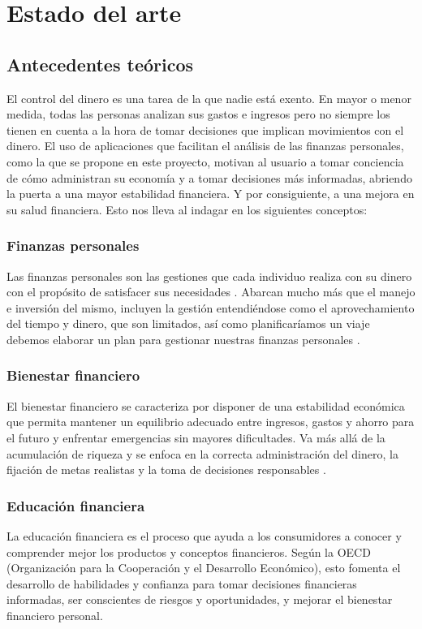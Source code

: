\chapter{Estado del arte}

\section{Antecedentes teóricos}

El control del dinero es una tarea de la que nadie está exento. En mayor o menor 
medida, todas las personas analizan sus gastos e ingresos pero no siempre los tienen en 
cuenta a la hora de tomar decisiones que implican movimientos con el dinero. El uso de 
aplicaciones que facilitan el análisis de las finanzas personales, como la que se propone 
en este proyecto,  motivan al usuario a tomar conciencia de cómo administran su economía 
y a tomar decisiones más informadas, abriendo la puerta a una mayor estabilidad financiera. 
Y por consiguiente, a una mejora en su salud financiera. Esto nos lleva al indagar 
en los siguientes conceptos:

\subsection*{Finanzas personales}
Las finanzas personales son las gestiones que cada individuo realiza con su dinero 
con el propósito de satisfacer sus necesidades \cite{tesis-bienestar-financiero}.
Abarcan mucho más que el manejo e inversión del mismo, incluyen la gestión  
entendiéndose como el aprovechamiento del tiempo y dinero, que son limitados, así 
como planificaríamos un viaje debemos elaborar un plan para gestionar nuestras 
finanzas personales \cite{tyson2023personal}. 

\subsection*{Bienestar financiero}
El bienestar financiero se caracteriza por disponer de una estabilidad económica que 
permita mantener un equilibrio adecuado entre ingresos, gastos y ahorro para el futuro 
y enfrentar emergencias sin mayores dificultades. Va más allá de la acumulación de 
riqueza y se enfoca en la correcta administración del dinero, la fijación de metas 
realistas y la toma de decisiones responsables \cite{tesis-cultura-financiera}.

\subsection*{Educación financiera}
La educación financiera es el proceso que ayuda a los consumidores a conocer y 
comprender mejor los productos y conceptos financieros. Según la OECD (Organización para la Cooperación y el Desarrollo Económico), esto fomenta el 
desarrollo de habilidades y confianza para tomar decisiones financieras informadas, ser 
conscientes de riesgos y oportunidades, y mejorar el bienestar financiero personal.


